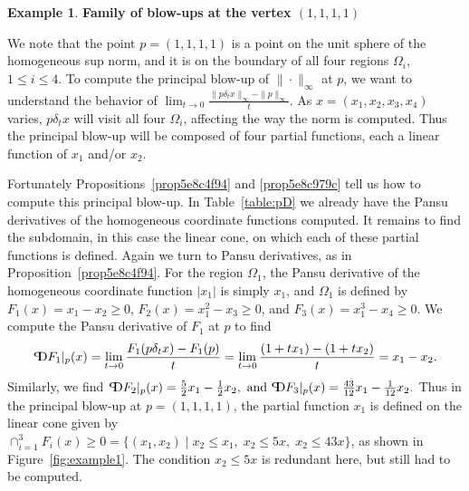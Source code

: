 \documentclass{article}
\theoremstyle{definition}
\newtheorem{ex}[theorem]{Example}
\newcommand{\norm}[1]{\|#1\|}
\newcommand{\pD}{\text{\scalebox{-1}[1]{$\mathrm{P}$}\!\!$\mathrm{D}$}}
\begin{document}
\begin{ex}\textbf{Family of blow-ups at the vertex $(1,1,1,1)$}

We note that the point $p = (1,1,1,1)$ is a point on the unit sphere of the homogeneous sup norm, and it is on the boundary of all four regions $\Omega_i$, $1\leq i \leq 4$. To compute the principal blow-up of $\norm{\cdot}_\infty$ at $p$, we want to understand the behavior of $\lim_{t\to0} \frac{\norm{p\delta_tx}_\infty - \norm{p}_\infty}{t}$. As $x= (x_1,x_2,x_3,x_4)$ varies, $p\delta_t x$ will visit all four $\Omega_i$, affecting the way the norm is computed. Thus the principal blow-up will be composed of four partial functions, each a linear function of $x_1$ and/or $x_2$.

Fortunately Propositions~\ref{prop5e8c4f94} and \ref{prop5e8c979c} tell us how to compute this principal blow-up. In Table~\ref{table:pD} we already have the Pansu derivatives of the homogeneous coordinate functions computed. It remains to find the subdomain, in this case the linear cone, on which each of these partial functions is defined. Again we turn to Pansu derivatives, as in Proposition~\ref{prop5e8c4f94}. For the region $\Omega_1$, the Pansu derivative of the homogeneous coordinate function $|x_1|$ is simply $x_1$, and $\Omega_1$ is defined by $F_1(x) = x_1 - x_2 \geq 0$, $F_2(x) = x_1^2 - x_3 \geq 0$, and $F_3(x) = x_1^3 - x_4 \geq 0$. We compute the Pansu derivative of $F_1$ at $p$ to find
\[
\pD F_1\vert_p(x) = \lim_{t\to0}\frac{F_1(p\delta_tx) - F_1(p)}{t} = \lim_{t\to0}\frac{(1+tx_1) - (1+tx_2)}{t} = x_1-x_2. 
\]
Similarly, we find 
$ \pD F_2\vert_p(x) = \frac52 x_1 - \frac12 x_2,
\text{ and } \pD F_3\vert_p(x) = \frac{43}{12} x_1 - \frac{1}{12} x_2.$
Thus in the principal blow-up at $p = (1,1,1,1)$, the partial function $x_1$ is defined on the linear cone given by $\cap_{i=1}^3 F_i(x) \geq 0 = \{(x_1,x_2) \mid x_2 \leq x_1,\; x_2 \leq 5x,\; x_2 \leq 43x \}$, as shown in Figure~\ref{fig:example1}. The condition $x_2 \leq 5x$ is redundant here, but still had to be computed.

\begin{figure}[h]
\centering
{}
\end{figure}
\end{ex}
\end{document}
